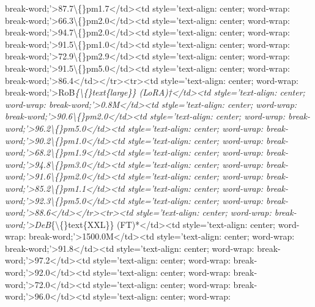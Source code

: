 \documentclass[conference]{IEEEtran}
\begin{document}
break-word;'\textgreater{}87.7\textbackslash\{\}pm1.7\textless{}/td\textgreater{}\textless{}td style='text-align: center; word-wrap: break-word;'\textgreater{}66.3\textbackslash\{\}pm2.0\textless{}/td\textgreater{}\textless{}td style='text-align: center; word-wrap: break-word;'\textgreater{}94.7\textbackslash\{\}pm2.0\textless{}/td\textgreater{}\textless{}td style='text-align: center; word-wrap: break-word;'\textgreater{}91.5\textbackslash\{\}pm1.0\textless{}/td\textgreater{}\textless{}td style='text-align: center; word-wrap: break-word;'\textgreater{}72.9\textbackslash\{\}pm2.9\textless{}/td\textgreater{}\textless{}td style='text-align: center; word-wrap: break-word;'\textgreater{}91.5\textbackslash\{\}pm5.0\textless{}/td\textgreater{}\textless{}td style='text-align: center; word-wrap: break-word;'\textgreater{}86.4\textless{}/td\textgreater{}\textless{}/tr\textgreater{}\textless{}tr\textgreater{}\textless{}td style='text-align: center; word-wrap: break-word;'\textgreater{}RoB\textit{\{\textbackslash\{\}text\{large\}\} (LoRA)†\textless{}/td\textgreater{}\textless{}td style='text-align: center; word-wrap: break-word;'\textgreater{}0.8M\textless{}/td\textgreater{}\textless{}td style='text-align: center; word-wrap: break-word;'\textgreater{}90.6\textbackslash\{\}pm2.0\textless{}/td\textgreater{}\textless{}td style='text-align: center; word-wrap: break-word;'\textgreater{}96.2\textbackslash\{\}pm5.0\textless{}/td\textgreater{}\textless{}td style='text-align: center; word-wrap: break-word;'\textgreater{}90.2\textbackslash\{\}pm1.0\textless{}/td\textgreater{}\textless{}td style='text-align: center; word-wrap: break-word;'\textgreater{}68.2\textbackslash\{\}pm1.9\textless{}/td\textgreater{}\textless{}td style='text-align: center; word-wrap: break-word;'\textgreater{}94.8\textbackslash\{\}pm3.0\textless{}/td\textgreater{}\textless{}td style='text-align: center; word-wrap: break-word;'\textgreater{}91.6\textbackslash\{\}pm2.0\textless{}/td\textgreater{}\textless{}td style='text-align: center; word-wrap: break-word;'\textgreater{}85.2\textbackslash\{\}pm1.1\textless{}/td\textgreater{}\textless{}td style='text-align: center; word-wrap: break-word;'\textgreater{}92.3\textbackslash\{\}pm5.0\textless{}/td\textgreater{}\textless{}td style='text-align: center; word-wrap: break-word;'\textgreater{}88.6\textless{}/td\textgreater{}\textless{}/tr\textgreater{}\textless{}tr\textgreater{}\textless{}td style='text-align: center; word-wrap: break-word;'\textgreater{}DeB}\{\textbackslash\{\}text\{XXL\}\} (FT)*\textless{}/td\textgreater{}\textless{}td style='text-align: center; word-wrap: break-word;'\textgreater{}1500.0M\textless{}/td\textgreater{}\textless{}td style='text-align: center; word-wrap: break-word;'\textgreater{}91.8\textless{}/td\textgreater{}\textless{}td style='text-align: center; word-wrap: break-word;'\textgreater{}97.2\textless{}/td\textgreater{}\textless{}td style='text-align: center; word-wrap: break-word;'\textgreater{}92.0\textless{}/td\textgreater{}\textless{}td style='text-align: center; word-wrap: break-word;'\textgreater{}72.0\textless{}/td\textgreater{}\textless{}td style='text-align: center; word-wrap: break-word;'\textgreater{}96.0\textless{}/td\textgreater{}\textless{}td style='text-align: center; word-wrap: 
\end{document}
